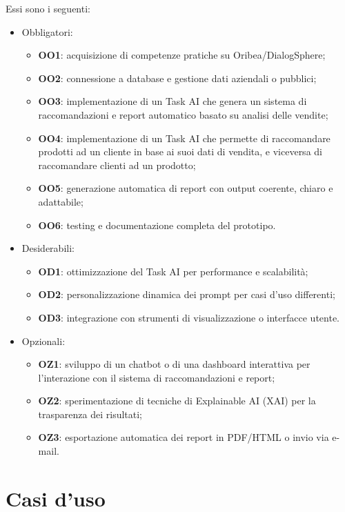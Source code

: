 Essi sono i seguenti:
\begin{itemize}
    \item Obbligatori:
    \begin{itemize}
        \item \textbf{OO1}: acquisizione di competenze pratiche su Oribea/DialogSphere;
        \item \textbf{OO2}: connessione a database e gestione dati aziendali o pubblici;
        \item \textbf{OO3}: implementazione di un Task AI che genera un sistema di raccomandazioni e report automatico basato su analisi delle vendite;
        \item \textbf{OO4}: implementazione di un Task AI che permette di raccomandare prodotti ad un cliente in base ai suoi dati di vendita, e viceversa di raccomandare clienti ad un prodotto;
        \item \textbf{OO5}: generazione automatica di report con output coerente, chiaro e adattabile;
        \item \textbf{OO6}: testing e documentazione completa del prototipo.
    \end{itemize}
    \item Desiderabili:
    \begin{itemize}
        \item \textbf{OD1}: ottimizzazione del Task AI per performance e scalabilità;
        \item \textbf{OD2}: personalizzazione dinamica dei prompt per casi d’uso differenti;
        \item \textbf{OD3}: integrazione con strumenti di visualizzazione o interfacce utente.
    \end{itemize}
    \item Opzionali:
    \begin{itemize}
        \item \textbf{OZ1}: sviluppo di un chatbot o di una dashboard interattiva per l'interazione con il sistema di raccomandazioni e report;
        \item \textbf{OZ2}: sperimentazione di tecniche di Explainable AI (XAI) per la trasparenza dei risultati;
        \item \textbf{OZ3}: esportazione automatica dei report in PDF/HTML o invio via e-mail.
    \end{itemize}
\end{itemize}


\newpage

\section{Casi d'uso}

